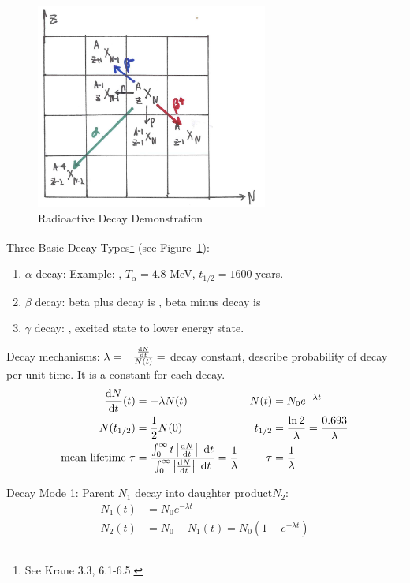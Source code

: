 \documentclass{school-22.101-notes}
\date{November 16, 2011}
\begin{document}
\maketitle

\begin{figure}[h]
    \centering
    \includegraphics[width=3in]{images/rd/Z-N-grid.png}
    \caption{Radioactive Decay Demonstration \label{Z-N-grid}}
\end{figure}
Three Basic Decay Types\footnote{See Krane 3.3, 6.1-6.5.} (see Figure~\ref{Z-N-grid}):
\begin{enumerate}
\item $\alpha$ decay:
Example: , $T_{\alpha} = 4.8$ MeV, $t_{1/2} = 1600$ years. 
\item $\beta$ decay: beta plus decay is , beta minus decay is 
\item $\gamma$ decay: , excited state to lower energy state.
\end{enumerate}
Decay mechanisms: $\lambda = -\frac{\frac{\mathrm{d}N}{\mathrm{d}t}}{N(t)} =$ decay constant, describe probability of decay per unit time. It is a constant for each decay. 
\begin{align}
\frac{\mathrm{d}N}{\mathrm{d}t} (t) &= - \lambda N(t) &  N(t) &= N_0 e^{-\lambda  t} \\
N(t_{1/2}) &= \frac{1}{2} N(0) & t_{1/2} &= \frac{\ln 2}{\lambda} = \frac{0.693}{\lambda} \\
\mbox{mean lifetime }\tau &= \frac{\int_0^{\infty} t \left| \frac{\mathrm{d}N}{\mathrm{d}t} \right| \mbox{ }\mathrm{d} t }{\int_0^{\infty}  \left| \frac{\mathrm{d}N}{\mathrm{d}t} \right| \mbox{ }\mathrm{d} t} = \frac{1}{\lambda} & \tau &= \frac{1}{\lambda}
\end{align}

Decay Mode 1: Parent $N_1$ decay into daughter product$N_2$: 
\begin{align}
N_1 (t) &= N_0 e^{-\lambda t} \\
N_2 (t) &= N_0 - N_1 (t) = N_0 (1 - e^{-\lambda t}) 
\end{align}
\end{document}

